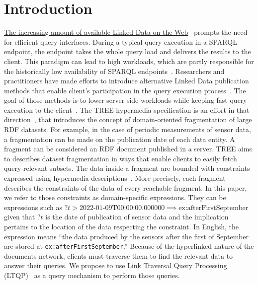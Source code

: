 \section{Introduction}



\href{https://lod-cloud.net/#diagram}{The increasing amount of available Linked Data on the Web}~\cite{Ermilov2013} prompts the need for efficient query interfaces.
During a typical query execution in a SPARQL endpoint, the endpoint takes the whole query load and delivers the results to the client.
This paradigm can lead to high workloads, which are partly responsible for the historically low availability of SPARQL endpoints~\cite{aranda2013}.
Researchers and practitioners have made efforts to introduce alternative Linked Data publication methods that enable client's participation in the query execution process~\cite{Verborgh2016TriplePF}.
The goal of those methods is to lower server-side workloads while keeping fast query execution to the client~\cite{Azzam2021}.
The TREE hypermedia specification is an effort in that direction~\cite{ColpaertMaterializedTREE, lancker2021LDS}, that introduces the concept of domain-oriented fragmentation of large RDF datasets.
For example, in the case of periodic measurements of sensor data, a fragmentation can be made on the publication date of each data entity.
A fragment can be considered an RDF document published in a server.
TREE aims to describes dataset fragmentation in ways that enable clients to easily fetch query-relevant subsets.
The data inside a fragment are bounded with constraints expressed using hypermedia descriptions~\cite{thomasFieldingPhdThesis}.
More precisely, each fragment describes the constraints of the data of every reachable fragment.
In this paper, we refer to those constraints as domain-specific expressions.
They can be expressions such as $?t > \text{2022-01-09T00:00:00.000000} \implies \text{ex:afterFirstSeptember}$ 
given that $?t$ is the date of publication of sensor data and the implication pertains to the location of the data respecting the constraint.
In English, the expression means ``the data produced by the sensors after the first of September are stored at \texttt{ex:afterFirstSeptember}.''
Because of the hyperlinked nature of the documents network, clients must traverse them to find the relevant data to answer their queries.
We propose to use Link Traversal Query Processing (LTQP)~\cite{Hartig2016} as a query mechanism to perform those queries.

